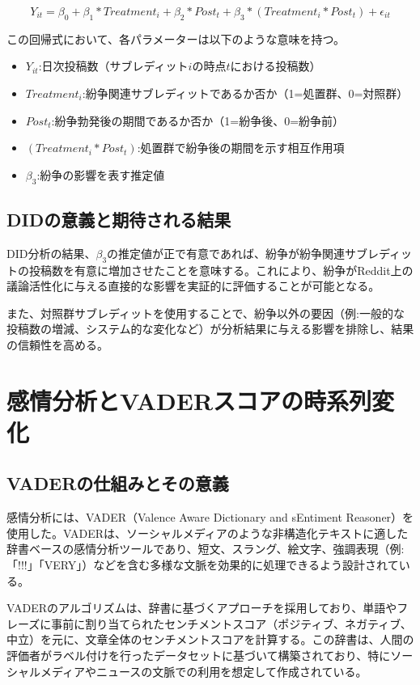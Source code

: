 \documentclass[11pt, a4j]{jreport}
\begin{document}
    \begin{equation}
        Y_{it} = \beta_{0} + \beta_{1}*Treatment_{i} + \beta_{2}*Post_{t} + \beta_{3}*(Treatment_{i} * Post_{t}) + \epsilon_{it}
    \end{equation}

    この回帰式において、各パラメーターは以下のような意味を持つ。
    \begin{itemize}
        \item $Y_{it}$:日次投稿数（サブレディット$i$の時点$t$における投稿数）
        \item $Treatment_{i}$:紛争関連サブレディットであるか否か（1=処置群、0=対照群）
        \item $Post_{t}$:紛争勃発後の期間であるか否か（1=紛争後、0=紛争前）
        \item $(Treatment_{i} * Post_{t})$:処置群で紛争後の期間を示す相互作用項
        \item $\beta_{3}$:紛争の影響を表す推定値
    \end{itemize}

    \subsection{DIDの意義と期待される結果}
    DID分析の結果、$\beta_{3}$の推定値が正で有意であれば、紛争が紛争関連サブレディットの投稿数を有意に増加させたことを意味する。これにより、紛争がReddit上の議論活性化に与える直接的な影響を実証的に評価することが可能となる。

    また、対照群サブレディットを使用することで、紛争以外の要因（例:一般的な投稿数の増減、システム的な変化など）が分析結果に与える影響を排除し、結果の信頼性を高める。

    \section{感情分析とVADERスコアの時系列変化}

    \subsection{VADERの仕組みとその意義}
    感情分析には、VADER（Valence Aware Dictionary and sEntiment Reasoner）を使用した。VADERは、ソーシャルメディアのような非構造化テキストに適した辞書ベースの感情分析ツールであり、短文、スラング、絵文字、強調表現（例:「!!!」「VERY」）などを含む多様な文脈を効果的に処理できるよう設計されている。

    VADERのアルゴリズムは、辞書に基づくアプローチを採用しており、単語やフレーズに事前に割り当てられたセンチメントスコア（ポジティブ、ネガティブ、中立）を元に、文章全体のセンチメントスコアを計算する。この辞書は、人間の評価者がラベル付けを行ったデータセットに基づいて構築されており、特にソーシャルメディアやニュースの文脈での利用を想定して作成されている。
\end{document}
